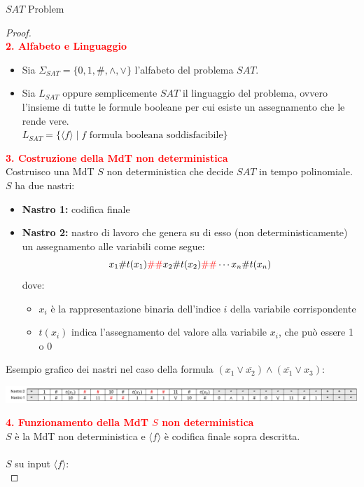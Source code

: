 \documentclass{article}  %
\theoremstyle{definition}
\begin{document}
\begin{theorem}{$SAT$ Problem}
\begin{proof}
\[		\]
		\textbf{\textcolor{red}{2. Alfabeto e Linguaggio}}
		\begin{itemize}
			\item Sia $\Sigma_{SAT} = \{0,1,\#,\land,\lor\}$ l'alfabeto del problema $SAT$.
			\item Sia $L_{SAT}$ oppure semplicemente $SAT$ il linguaggio del problema, ovvero l'insieme di tutte le formule booleane per cui esiste un assegnamento che le rende vere. \\
			      $L_{SAT} = \{\langle f \rangle \mid f \text{ formula booleana soddisfacibile}\}$
		\end{itemize}
		\textbf{\textcolor{red}{3. Costruzione della MdT non deterministica}} \\
		Costruisco una MdT $S$ non deterministica che decide $SAT$ in tempo polinomiale. \\
		$S$ ha due nastri:
		\begin{itemize}
			\item \textbf{Nastro 1:} codifica finale
			\item \textbf{Nastro 2:} nastro di lavoro che genera su di esso (non deterministicamente) un assegnamento alle variabili come segue:
			      \[
				      x_1\#t(x_1)\textcolor{red}{\#\#}x_2\#t(x_2)\textcolor{red}{\#\#}\cdots x_n\#t(x_n)
			      \]
			      dove:
			      \begin{itemize}
				      \item $x_i$ è la rappresentazione binaria dell'indice $i$ della variabile corrispondente
				      \item $t(x_i)$ indica l'assegnamento del valore alla variabile $x_i$, che può essere 1 o 0
			      \end{itemize}
		\end{itemize}
		Esempio grafico dei nastri nel caso della formula $(x_1 \lor \overline{x_2}) \land (\overline{x_1} \lor x_3)$:
		\begin{center}
			\includegraphics[width=1.04\linewidth]{sat-tapes-mdt.png}
		\end{center}
		\textbf{\textcolor{red}{4. Funzionamento della MdT $S$ non deterministica}} \\
		$S$ è la MdT non deterministica e $\langle f \rangle$ è codifica finale sopra descritta. \\ \\
		$S$ su input $\langle f \rangle$: \\

\end{proof}
\end{theorem}
\end{document}
